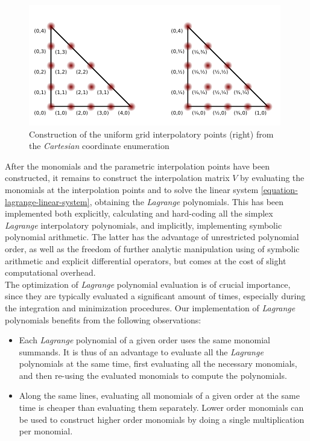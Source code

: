 \begin{figure}[hp]
    \centering
    \includegraphics[scale=2.0]{images/curvilinear-numbering-generation}
    \caption{Construction of the uniform grid interpolatory points (right) from the \textit{Cartesian} coordinate enumeration}
    \label{fig:lagrange:enumerationconstruction}
\end{figure}

\noindent
After the monomials and the parametric interpolation points have been constructed, it remains to construct the interpolation matrix $V$ by evaluating the monomials at the interpolation points and to solve the linear system \cref{equation-lagrange-linear-system}, obtaining the \textit{Lagrange} polynomials. This has been implemented both explicitly, calculating and hard-coding all the simplex \textit{Lagrange} interpolatory polynomials, and implicitly, implementing symbolic polynomial arithmetic. The latter has the advantage of unrestricted polynomial order, as well as the freedom of further analytic manipulation using of symbolic arithmetic and explicit differential operators, but comes at the cost of slight computational overhead. \\

\noindent
The optimization of \textit{Lagrange} polynomial evaluation is of crucial importance, since they are typically evaluated a significant amount of times, especially during the integration and minimization procedures. Our implementation of \textit{Lagrange} polynomials benefits from the following observations:
\begin{itemize}
  \item Each \textit{Lagrange} polynomial of a given order uses the same monomial summands. It is thus of an advantage to evaluate all the \textit{Lagrange} polynomials at the same time, first evaluating all the necessary monomials, and then re-using the evaluated monomials to compute the polynomials.
  \item Along the same lines, evaluating all monomials of a given order at the same time is cheaper than evaluating them separately. Lower order monomials can be used to construct higher order monomials by doing a single multiplication per monomial.
\end{itemize}





